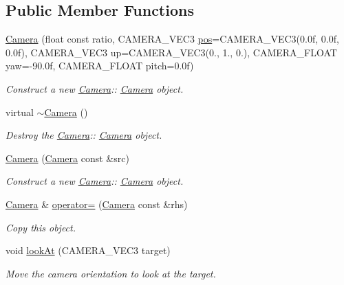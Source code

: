 \subsection*{Public Member Functions}
\begin{DoxyCompactItemize}
\item 
\hyperlink{class_camera_a9013f69b8ad8b9f17c23cc9fd4bb25be}{Camera} (float const ratio, C\+A\+M\+E\+R\+A\+\_\+\+V\+E\+C3 \hyperlink{class_camera_a645cd9343d8c0160ce2281111240f9fd}{pos}=C\+A\+M\+E\+R\+A\+\_\+\+V\+E\+C3(0.\+0f, 0.\+0f, 0.\+0f), C\+A\+M\+E\+R\+A\+\_\+\+V\+E\+C3 up=\+C\+A\+M\+E\+R\+A\+\_\+\+V\+E\+C3(0., 1., 0.), C\+A\+M\+E\+R\+A\+\_\+\+F\+L\+O\+A\+T yaw=-\/90.\+0f, C\+A\+M\+E\+R\+A\+\_\+\+F\+L\+O\+A\+T pitch=0.\+0f)
\begin{DoxyCompactList}\small\item\em Construct a new \hyperlink{class_camera}{Camera}\+:\+: \hyperlink{class_camera}{Camera} object. \end{DoxyCompactList}\item 
\mbox{\label{class_camera_ad1897942d0ccf91052386388a497349f}} 
virtual \hyperlink{class_camera_ad1897942d0ccf91052386388a497349f}{$\sim$\+Camera} ()
\begin{DoxyCompactList}\small\item\em Destroy the \hyperlink{class_camera}{Camera}\+:\+: \hyperlink{class_camera}{Camera} object. \end{DoxyCompactList}\item 
\hyperlink{class_camera_ae436ecbffdf1bb1117a723603f5b9a63}{Camera} (\hyperlink{class_camera}{Camera} const \&src)
\begin{DoxyCompactList}\small\item\em Construct a new \hyperlink{class_camera}{Camera}\+:\+: \hyperlink{class_camera}{Camera} object. \end{DoxyCompactList}\item 
\hyperlink{class_camera}{Camera} \& \hyperlink{class_camera_a7df2f4b79b58047d59902a2e8b40855d}{operator=} (\hyperlink{class_camera}{Camera} const \&rhs)
\begin{DoxyCompactList}\small\item\em Copy this object. \end{DoxyCompactList}\item 
void \hyperlink{class_camera_a54c2f4e2c30c1fc0c82499982b59e6e0}{look\+At} (C\+A\+M\+E\+R\+A\+\_\+\+V\+E\+C3 target)
\begin{DoxyCompactList}\small\item\em Move the camera orientation to look at the target. \end{DoxyCompactList}\item 

\end{DoxyCompactItemize}
